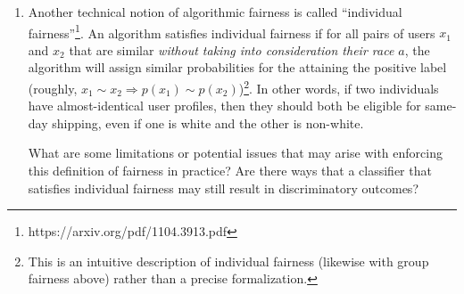 \documentclass[submit]{harvardml}
\begin{document}
\begin{problem}
\begin{enumerate}
    \item Another technical notion of algorithmic fairness is called ``individual fairness''\footnote{https://arxiv.org/pdf/1104.3913.pdf}. An algorithm satisfies individual fairness if for all pairs of users $x_1$ and $x_2$ that are similar \emph{without taking into consideration their race $a$}, the algorithm will assign similar probabilities for the attaining the positive label (roughly, $x_1 \sim x_2 \Rightarrow p(x_1) \sim p(x_2)$)\footnote{This is an intuitive description of individual fairness (likewise with group fairness above) rather than a precise formalization.}.  In other words, if two individuals have almost-identical user profiles, then they should both be eligible for same-day shipping, even if one is white and the other is non-white.
    
    What are some limitations or potential issues that may arise with enforcing this definition of fairness in practice?  Are there ways that a classifier that satisfies individual fairness may still result in discriminatory outcomes?
    
\end{enumerate}

\end{problem}

\end{document}
